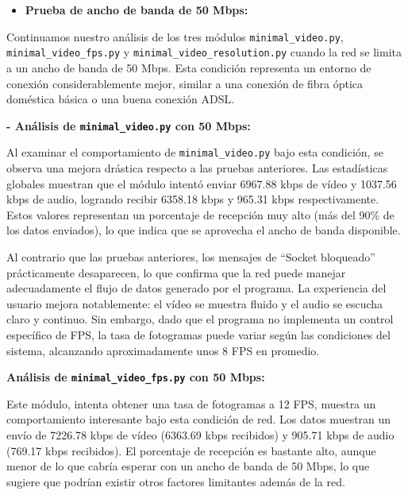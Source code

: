 \newpage

\begin{itemize}
  \item \textbf{Prueba de ancho de banda de 50 Mbps:}
\end{itemize}

Continuamos nuestro análisis de los tres módulos \texttt{minimal\_video.py}, \texttt{minimal\_video\_fps.py} y \texttt{minimal\_video\_resolution.py} cuando la red se limita a un ancho de banda de 50 Mbps. Esta condición representa un entorno de conexión considerablemente mejor, similar a una conexión de fibra óptica doméstica básica o una buena conexión ADSL.

\vspace{\baselineskip}

\textbf{- Análisis de \texttt{minimal\_video.py} con 50 Mbps:}
\vspace{\baselineskip}

Al examinar el comportamiento de \texttt{minimal\_video.py} bajo esta condición, se observa una mejora drástica respecto a las pruebas anteriores. Las estadísticas globales muestran que el módulo intentó enviar 6967.88 kbps de vídeo y 1037.56 kbps de audio, logrando recibir 6358.18 kbps y 965.31 kbps respectivamente. Estos valores representan un porcentaje de recepción muy alto (más del 90\% de los datos enviados), lo que indica que se aprovecha el ancho de banda disponible.
\vspace{\baselineskip}

Al contrario que las pruebas anteriores, los mensajes de ``Socket bloqueado'' prácticamente desaparecen, lo que confirma que la red puede manejar adecuadamente el flujo de datos generado por el programa. La experiencia del usuario mejora notablemente: el vídeo se muestra fluido y el audio se escucha claro y continuo. Sin embargo, dado que el programa no implementa un control específico de FPS, la tasa de fotogramas puede variar según las condiciones del sistema, alcanzando aproximadamente unos 8 FPS en promedio.

\vspace{\baselineskip}

\textbf{Análisis de \texttt{minimal\_video\_fps.py} con 50 Mbps:}
\vspace{\baselineskip}

Este módulo, intenta obtener una tasa de fotogramas a 12 FPS, muestra un comportamiento interesante bajo esta condición de red. Los datos muestran un envío de 7226.78 kbps de vídeo (6363.69 kbps recibidos) y 905.71 kbps de audio (769.17 kbps recibidos). El porcentaje de recepción es bastante alto, aunque menor de lo que cabría esperar con un ancho de banda de 50 Mbps, lo que sugiere que podrían existir otros factores limitantes además de la red.
\vspace{\baselineskip}

